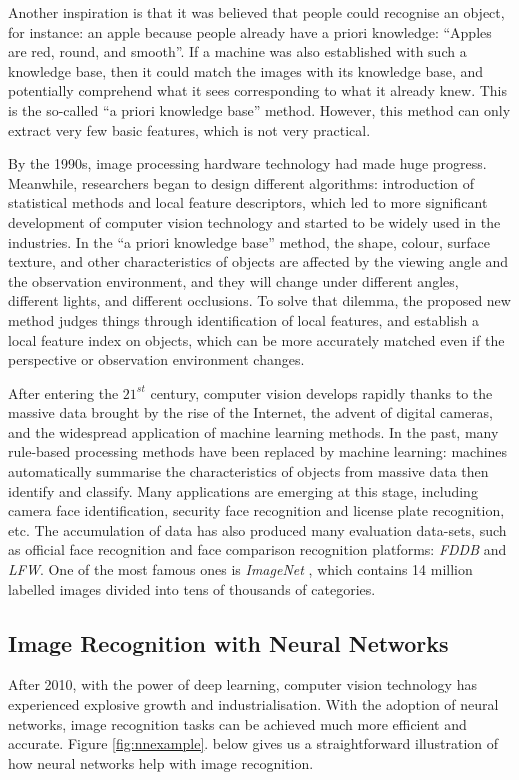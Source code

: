 Another inspiration is that it was believed that people could recognise an object, for instance: an apple because people already have a priori knowledge: ``Apples are red, round, and smooth''. If a machine was also established with such a knowledge base, then it could match the images with its knowledge base, and potentially comprehend what it sees corresponding to what it already knew. This is the so-called ``a priori knowledge base'' method. However, this method can only extract very few basic features, which is not very practical.

By the 1990s, image processing hardware technology had made huge progress. Meanwhile, researchers began to design different algorithms: introduction of statistical methods and local feature descriptors, which led to more significant development of computer vision technology and started to be widely used in the industries. In the ``a priori knowledge base'' method, the shape, colour, surface texture, and other characteristics of objects are affected by the viewing angle and the observation environment, and they will change under different angles, different lights, and different occlusions. To solve that dilemma, the proposed new method judges things through identification of local features, and establish a local feature index on objects, which can be more accurately matched even if the perspective or observation environment changes.

After entering the $21^{st}$ century, computer vision develops rapidly thanks to the massive data brought by the rise of the Internet, the advent of digital cameras, and the widespread application of machine learning methods. In the past, many rule-based processing methods have been replaced by machine learning: machines automatically summarise the characteristics of objects from massive data then identify and classify. Many applications are emerging at this stage, including camera face identification, security face recognition and license plate recognition, etc. The accumulation of data has also produced many evaluation data-sets, such as official face recognition and face comparison recognition platforms: \textit{FDDB} and \textit{LFW}. One of the most famous ones is \textit{ImageNet} \cite{imagenet}, which contains 14 million labelled images divided into tens of thousands of categories.


\subsection{Image Recognition with Neural Networks}
After 2010, with the power of deep learning, computer vision technology has experienced explosive growth and industrialisation. With the adoption of neural networks, image recognition tasks can be achieved much more efficient and accurate. Figure \ref{fig:nnexample}. below gives us a straightforward illustration of how neural networks help with image recognition.

